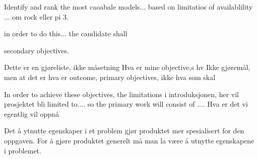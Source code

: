 Identify and rank the most caoabale models...
based on limitatios of availablility ... om rock eller pi 3. 

in order to do this...
the candidate shall

secondary objectives. 

Dette er en gjøreliste, ikke måsetning
Hva er mine objective,s hv
Ikke gjøremål, men at det er hva er outcome, primary objectives, ikke hva som skal 

In order to achieve these objectives, the 
limitations i introduksjonen, her vil prosjektet bli limited to.... so the primary work will consist of ....
Hva er det vi egentlig vil oppnå

Det å ytnutte egenskaper i et problem gjør produktet mer spesialisert for den oppgaven. For å gjøre produktet generelt må man la være å utnytte egenskapene i problemet.